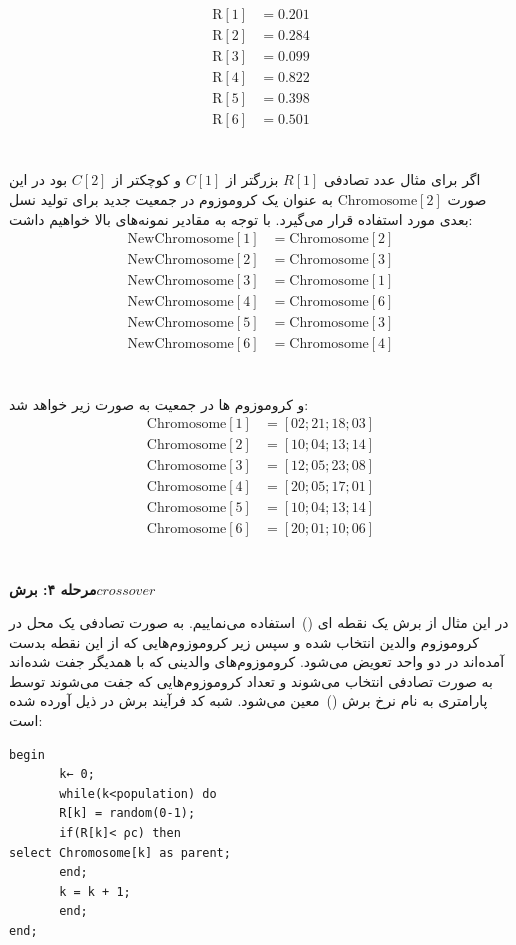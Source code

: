\documentclass[11pt]{article}
\begin{document}
\[
\begin{align*}
\text{R}[1] &= 0.201\\ 
\text{R}[2] &= 0.284\\
\text{R}[3] &= 0.099\\ 
\text{R}[4] &= 0.822\\ 
\text{R}[5] &= 0.398\\
\text{R}[6] &= 0.501 
\end{align*}
\]
\\
\\
اگر برای مثال عدد تصادفی \( R[1] \)  بزرگتر از \( C[1] \)  و کوچکتر از  \( C[2] \) بود در این صورت \( \text{Chromosome}[2] \)  به عنوان یک کروموزوم در جمعیت جدید برای تولید نسل بعدی مورد استفاده قرار می‌گیرد. با توجه به مقادیر نمونه‌های بالا خواهیم داشت:
\\
\[
\begin{align*}
\text{NewChromosome}[1] &= \text{Chromosome}[2] \\
\text{NewChromosome}[2] &= \text{Chromosome}[3] \\
\text{NewChromosome}[3] &= \text{Chromosome}[1] \\
\text{NewChromosome}[4] &= \text{Chromosome}[6] \\
\text{NewChromosome}[5] &= \text{Chromosome}[3] \\
\text{NewChromosome}[6] &= \text{Chromosome}[4]
\end{align*}
\]
\\
\\

و کروموزوم ها در جمعیت به صورت زیر خواهد شد:
\\
\[
\begin{align*}
\text{Chromosome}[1] &= [02;21;18;03] \\
\text{Chromosome}[2] &= [10;04;13;14] \\
\text{Chromosome}[3] &= [12;05;23;08] \\
\text{Chromosome}[4] &= [20;05;17;01] \\
\text{Chromosome}[5] &= [10;04;13;14] \\
\text{Chromosome}[6] &= [20;01;10;06]
\end{align*}
\]
\\
\\

\textbf{مرحله ۴: برش\(crossover\)}

در این مثال از برش یک نقطه ای ()\ استفاده می‌نماییم. به صورت تصادفی یک محل در کروموزوم والدین انتخاب شده و سپس زیر کروموزوم‌هایی که از این نقطه بدست آمده‌اند در دو واحد تعویض می‌شود. کروموزوم‌های والدینی که با همدیگر جفت شده‌اند به صورت تصادفی انتخاب می‌شوند و تعداد کروموزوم‌هایی که جفت می‌شوند توسط پارامتری به نام نرخ برش ()\ معین می‌شود. شبه کد فرآیند برش در ذیل آورده شده است:
\begin{flushleft}
\begin{verbatim}
begin 
       k← 0;
       while(k<population) do 
       R[k] = random(0-1); 
       if(R[k]< ρc) then
select Chromosome[k] as parent; 
       end;
       k = k + 1;
       end;
end;
\end{verbatim}
\end{flushleft}
\end{document}
